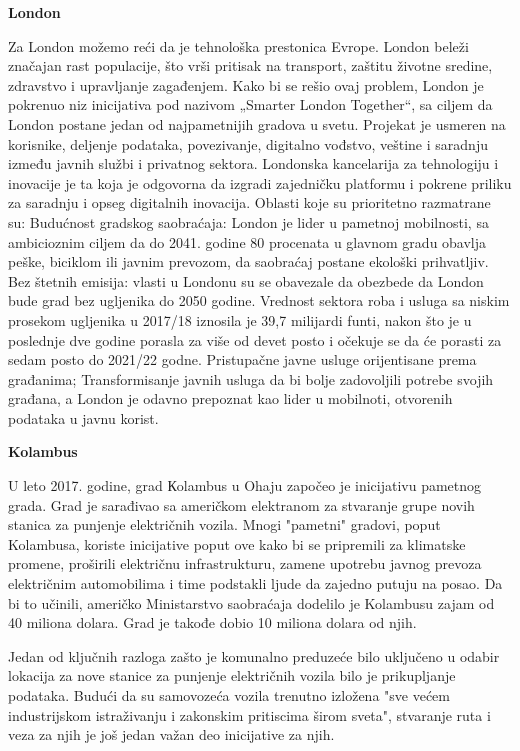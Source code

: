 \documentclass[a4paper,12pt]{article}
\begin{document}
{\begin{itemize}
 \textbf{London}
 
 Za London možemo reći da je tehnološka prestonica Evrope. London beleži značajan rast populacije, što vrši pritisak na transport, zaštitu životne sredine, zdravstvo i upravljanje zagađenjem. Kako bi se rešio ovaj problem, London je pokrenuo niz inicijativa pod nazivom „Smarter London Together“, sa ciljem da London postane jedan od najpametnijih gradova u svetu. Projekat je usmeren na korisnike, deljenje podataka, povezivanje, digitalno vođstvo, veštine i saradnju između javnih službi i privatnog sektora.
Londonska kancelarija za tehnologiju i inovacije je ta koja je odgovorna da izgradi zajedničku platformu i pokrene priliku za saradnju i opseg digitalnih inovacija.
Oblasti koje su prioritetno razmatrane su:
Budućnost gradskog saobraćaja: London je lider u pametnoj mobilnosti, sa ambicioznim ciljem da do 2041. godine 80 procenata u glavnom gradu obavlja peške, biciklom ili javnim prevozom, da
saobraćaj postane ekološki prihvatljiv.
 Bez štetnih emisija: vlasti u Londonu su se obavezale da obezbede da London bude grad bez ugljenika do 2050 godine.
Vrednost sektora roba i usluga sa niskim prosekom ugljenika u 2017/18 iznosila je 39,7 milijardi funti, nakon što je u poslednje dve godine porasla za više od devet posto i očekuje se da će porasti za sedam posto do 2021/22 godne. 
Pristupačne javne usluge orijentisane prema građanima; Transformisanje javnih usluga da bi bolje zadovoljili potrebe svojih građana, a London je odavno prepoznat kao lider u mobilnoti, otvorenih podataka u javnu korist.

 \textbf{Kolambus }
 
 U leto 2017. godine, grad Кolambus u Ohaju započeo je inicijativu pametnog grada. Grad je sarađivao sa američkom elektranom za stvaranje grupe novih stanica za punjenje električnih vozila. Mnogi "pametni" gradovi, poput Kolambusa, koriste inicijative poput ove kako bi se pripremili za klimatske promene, proširili električnu infrastrukturu, zamene upotrebu javnog prevoza  električnim automobilima i time podstakli ljude da zajedno putuju na posao. Da bi to učinili, američko Ministarstvo saobraćaja dodelilo je Kolambusu zajam od 40 miliona dolara. Grad je takođe dobio 10 miliona dolara od njih.

Jedan od ključnih razloga zašto je komunalno preduzeće bilo uključeno u odabir lokacija za nove stanice za punjenje električnih vozila bilo je prikupljanje podataka.
Budući da su samovozeća vozila trenutno izložena "sve većem industrijskom istraživanju i zakonskim pritiscima širom sveta", stvaranje ruta i veza za njih je još jedan važan deo inicijative za njih.
\end{itemize} 



}
\end{document}
